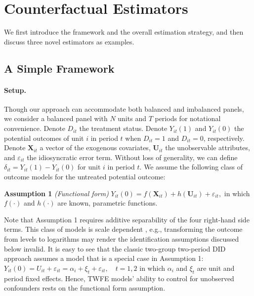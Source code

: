 \documentclass[12pt]{article}
\let\oldcenter\center
\let\oldendcenter\endcenter
\renewenvironment{center}{\setlength\topsep{0pt}\oldcenter}{\oldendcenter}
\begin{document}
\section{Counterfactual Estimators}\label{sc:estimators}

We first introduce the framework and the overall estimation strategy, and then discuss three novel estimators as examples. 

\subsection{A Simple Framework}

\paragraph{Setup.} Though our approach can accommodate both balanced and imbalanced panels, we consider a balanced panel with $N$ units and $T$ periods for notational convenience. Denote $D_{it}$ the treatment status. Denote $Y_{it}(1)$ and $Y_{it}(0)$ the potential outcomes of unit $i$ in period $t$ when $D_{it} = 1$ and $D_{it} = 0$, respectively. Denote $\mathbf{X}_{it}$ a vector of the exogenous covariates, $\mathbf{U}_{it}$ the unobservable attributes, and $\varepsilon_{it}$ the idiosyncratic error term. Without loss of generality, we can define $\delta_{it} = Y_{it}(1) - Y_{it}(0)$ for unit $i$ in period $t$. We assume the following class of outcome models for the untreated potential outcome:

\bigskip\noindent\textbf{Assumption 1} \textit{(Functional form)} $Y_{it}(0) = f(\mathbf{X}_{it}) + h(\mathbf{U}_{it}) + \varepsilon_{it},$ in which $f(\cdot)$ and $h(\cdot)$ are known, parametric functions. 

\medskip Note that Assumption 1 requires additive separability of the four right-hand side terms. This class of models is scale dependent \citep{AtheyImbens2006}, e.g., transforming the outcome from levels to logarithms may render the identification assumptions discussed below invalid. It is easy to see that the classic two-group two-period DID approach assumes a model that is a special case in Assumption 1: 
\begin{center}
$Y_{it}(0) = U_{it} + \varepsilon_{it} = \alpha_i + \xi_t + \varepsilon_{it},\quad t = 1, 2$
\end{center}
in which $\alpha_i$ and $\xi_{t}$ are unit and period fixed effects. Hence, TWFE models' ability to control for unobserved confounders rests on the functional form assumption.
\end{document}
